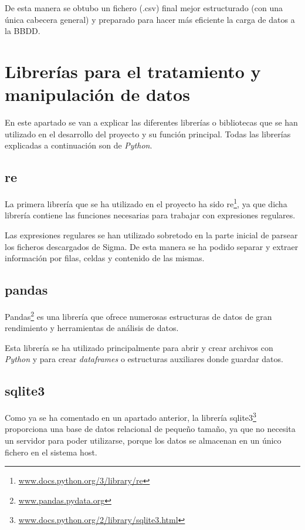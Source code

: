 De esta manera se obtubo un fichero (.csv) final mejor estructurado (con una única cabecera general) y preparado para hacer más eficiente la carga de datos a la BBDD.


\section{Librerías para el tratamiento y manipulación de datos}\label{librerias}
En este apartado se van a explicar las diferentes librerías o bibliotecas que se han utilizado en el desarrollo del proyecto y su función principal. Todas las librerías explicadas a continuación son de \emph{Python}.

\subsection{re}
La primera librería que se ha utilizado en el proyecto ha sido re\footnote{\href {https://docs.python.org/3/library/re.html}{www.docs.python.org/3/library/re}}, ya que dicha librería contiene las funciones necesarias para trabajar con expresiones regulares.

Las expresiones regulares se han utilizado sobretodo en la parte inicial de parsear los ficheros descargados de Sigma. De esta manera se ha podido separar y extraer información por filas, celdas y contenido de las mismas.


\subsection{pandas}
Pandas\footnote{\href{https://pandas.pydata.org/}{www.pandas.pydata.org}} es una librería que ofrece numerosas estructuras de datos de gran rendimiento y herramientas de análisis de datos.

Esta librería se ha utilizado principalmente para abrir y crear archivos con \emph{Python} y para crear \emph{dataframes} o estructuras auxiliares donde guardar datos.  


\subsection{sqlite3}
Como ya se ha comentado en un apartado anterior, la librería sqlite3\footnote{\href{https://docs.python.org/2/library/sqlite3.html}{www.docs.python.org/2/library/sqlite3.html}} proporciona una base de datos relacional de pequeño tamaño, ya que no necesita un servidor para poder utilizarse, porque los datos se almacenan en un único fichero en el sistema host.

